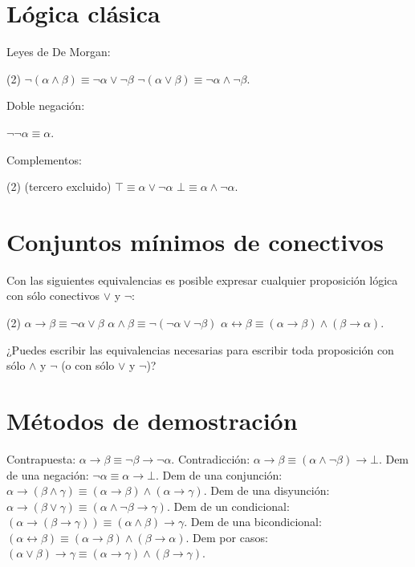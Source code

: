 \documentclass[letterpaper,DIV=12,headsepline,12pt]{scrartcl}
\begin{document}
\section{Lógica clásica}
Leyes de De Morgan:
\begin{tasks}(2)
  \task \(\neg(\alpha\land\beta)\equiv\neg\alpha\lor\neg\beta\)
  \task \(\neg(\alpha\lor\beta)\equiv\neg\alpha\land\neg\beta\).
\end{tasks}
%
Doble negación:
\begin{tasks}
  \task \(\neg\neg\alpha\equiv\alpha\).
\end{tasks}
%
Complementos:
\begin{tasks}(2)
  \task (tercero excluido) \(\top\equiv\alpha\lor\neg\alpha\)
  \task \(\bot\equiv\alpha\land\neg\alpha\).
\end{tasks}

\section{Conjuntos mínimos de conectivos}
Con las siguientes equivalencias es posible expresar cualquier proposición
lógica con sólo conectivos \(\lor\) y \(\neg\):
\begin{tasks}(2)
  \task \(\alpha\to\beta\equiv\neg\alpha\lor\beta\)
  \task \(\alpha\land\beta\equiv\neg(\neg\alpha\lor\neg\beta)\)
  \task* \(\alpha\leftrightarrow\beta\equiv(\alpha\to\beta)\land(\beta\to\alpha)\).
\end{tasks}
¿Puedes escribir las equivalencias necesarias para escribir toda proposición con
sólo \(\land\) y \(\neg\) (o con sólo \(\lor\) y \(\neg\))?

\section{Métodos de demostración}
\begin{tasks}
  \task Contrapuesta: \(\alpha\to\beta\equiv\neg\beta\to\neg\alpha\).
  \task Contradicción: \(\alpha\to\beta\equiv(\alpha\land\neg\beta)\to\bot\).
  \task Dem de una negación: \(\neg\alpha\equiv\alpha\to\bot\).
  \task Dem de una conjunción: 
  \(\alpha\to(\beta\land\gamma)\equiv(\alpha\to\beta)\land(\alpha\to\gamma)\).
  \task Dem de una disyunción:
  \(\alpha\to(\beta\lor\gamma)\equiv(\alpha\land\neg\beta\to\gamma)\).
  \task Dem de un condicional:
  \((\alpha\to(\beta\to\gamma))\equiv(\alpha\land\beta)\to\gamma\).
  \task Dem de una bicondicional:
  \((\alpha\leftrightarrow\beta)\equiv(\alpha\to\beta)\land(\beta\to\alpha)\).
  \task Dem por casos:
  \((\alpha\lor\beta)\to\gamma\equiv(\alpha\to\gamma)\land(\beta\to\gamma)\).
\end{tasks}
\end{document}
